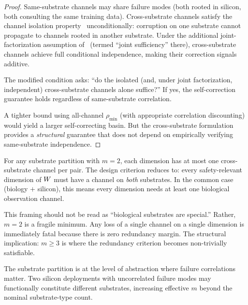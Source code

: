 \begin{proof}
Same-substrate channels may share failure modes (both rooted in
silicon, both consulting the same training data).  Cross-substrate
channels satisfy the channel isolation property~\citep{lasser2026exo} unconditionally:
corruption on one substrate cannot propagate to channels rooted in
another substrate.  Under the additional joint-factorization assumption
of~\citet{lasser2026exo} (termed ``joint sufficiency'' there), cross-substrate
channels achieve full conditional independence, making their
correction signals additive.

The modified condition asks: ``do the isolated (and, under joint
factorization, independent) cross-substrate channels alone suffice?''
If yes, the self-correction guarantee holds regardless of
same-substrate correlation.

A tighter bound using all-channel $\rho_{\min}$ (with appropriate
correlation discounting) would yield a larger self-correcting basin.
But the cross-substrate formulation provides a \emph{structural}
guarantee that does not depend on empirically verifying same-substrate
independence.
\end{proof}

\begin{remark}[$m = 2$ specialization]
\label{rem:m2}
For any substrate partition with $m = 2$, each dimension has at most
one cross-substrate channel per pair.  The design criterion reduces to:
every safety-relevant dimension of $W$ must have a channel on
\emph{both} substrates.  In the common case (biology $+$ silicon), this
means every dimension needs at least one biological observation channel.

This framing should not be read as ``biological substrates are
special.''  Rather, $m = 2$ is a fragile minimum.  Any loss of a
single channel on a single dimension is immediately fatal because
there is zero redundancy margin.  The structural implication: $m \geq
3$ is where the redundancy criterion becomes non-trivially
satisfiable.

The substrate partition is at the level of abstraction where failure
correlations matter.  Two silicon deployments with uncorrelated failure
modes may functionally constitute different substrates, increasing
effective $m$ beyond the nominal substrate-type count.
\end{remark}
